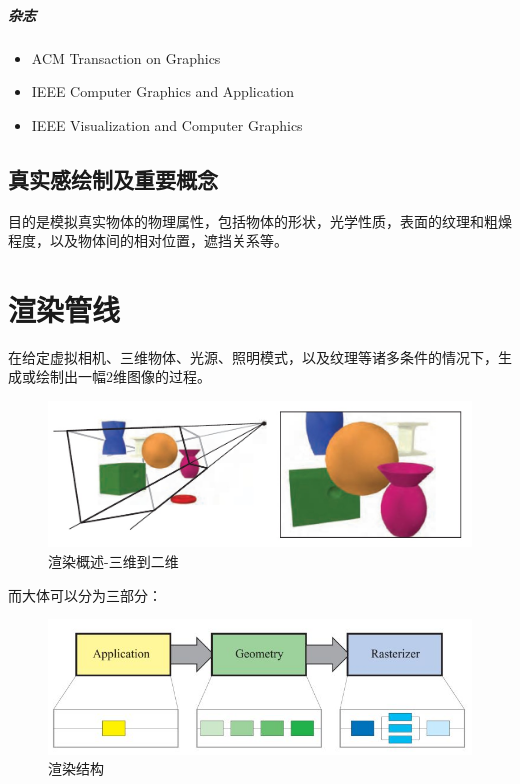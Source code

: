 \documentclass[UTF8,a4paper,12pt]{ctexbook}
\begin{document}
		\paragraph{杂志}
			\begin{itemize}
				\item ACM Transaction on Graphics
				\item IEEE Computer Graphics and Application
				\item IEEE Visualization and Computer Graphics
			\end{itemize}


	\section{真实感绘制及重要概念}
		目的是模拟真实物体的物理属性，包括物体的形状，光学性质，表面的纹理和粗燥程度，以及物体间的相对位置，遮挡关系等。
		
			
		
		
\chapter{渲染管线}
	在给定虚拟相机、三维物体、光源、照明模式，以及纹理等诸多条件的情况下，生成或绘制出一幅2维图像的过程。
		\begin{figure}[H]
			\centering
			\includegraphics[scale=0.5]{Outline}
			\caption{渲染概述-三维到二维}
		\end{figure}
		
		而大体可以分为三部分：
		
		\begin{figure}[H]
			\centering
			\includegraphics[scale=0.7]{Outline2}
			\caption{渲染结构}
		\end{figure}
		
\end{document}
